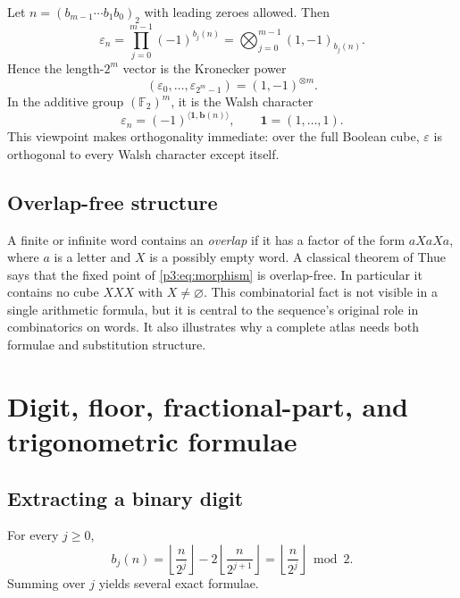 \documentclass[11pt,oneside]{article}
\theoremstyle{definition}
\theoremstyle{remark}
\newcommand{\Ftwo}{\mathbb F_2}
\newcommand{\eps}{\varepsilon}
\newcommand{\floor}[1]{\left\lfloor #1\right\rfloor}
\begin{document}
Let $n=(b_{m-1}\cdots b_1b_0)_2$ with leading zeroes allowed.  Then
\begin{equation}\label{p3:eq:tensor-character}
 \eps_n=\prod_{j=0}^{m-1}(-1)^{b_j(n)}
       =\bigotimes_{j=0}^{m-1}(1,-1)_{b_j(n)}.
\end{equation}
Hence the length-$2^m$ vector is the Kronecker power
\begin{equation}\label{p3:eq:kronecker}
 (\eps_0,\ldots,\eps_{2^m-1})=(1,-1)^{\otimes m}.
\end{equation}
In the additive group $(\Ftwo)^m$, it is the Walsh character
\begin{equation}\label{p3:eq:walsh-character}
  \eps_n=(-1)^{\langle \mathbf 1,\mathbf b(n)\rangle},
  \qquad \mathbf 1=(1,\ldots,1).
\end{equation}
This viewpoint makes orthogonality immediate: over the full Boolean cube,
$\eps$ is orthogonal to every Walsh character except itself.

\subsection{Overlap-free structure}

A finite or infinite word contains an \emph{overlap} if it has a factor of the
form $aXaXa$, where $a$ is a letter and $X$ is a possibly empty word.  A
classical theorem of Thue says that the fixed point of \cref{p3:eq:morphism} is
overlap-free.  In particular it contains no cube $XXX$ with $X\ne\varnothing$.
This combinatorial fact is not visible in a single arithmetic formula, but it
is central to the sequence's original role in combinatorics on words.  It also
illustrates why a complete atlas needs both formulae and substitution
structure.

\section{Digit, floor, fractional-part, and trigonometric formulae}

\subsection{Extracting a binary digit}

For every $j\ge0$,
\begin{equation}\label{p3:eq:binary-digit-floor}
 b_j(n)=\floor{\frac{n}{2^j}}-2\floor{\frac{n}{2^{j+1}}}
       =\floor{\frac{n}{2^j}}\bmod 2.
\end{equation}
Summing over $j$ yields several exact formulae.
\end{document}
